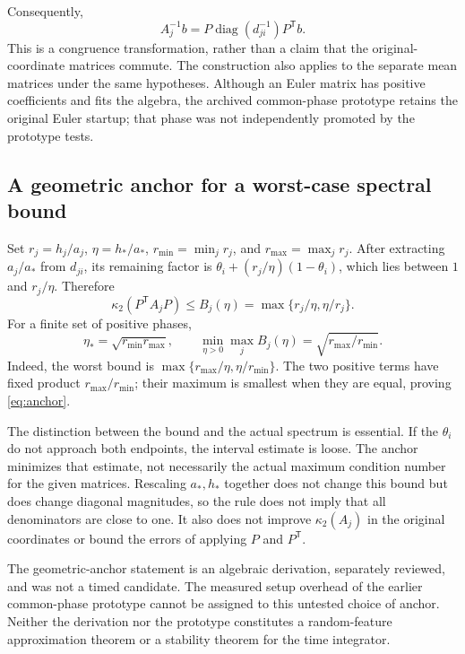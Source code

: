 Consequently,
\begin{equation}
 A_j^{-1}b=P\operatorname{diag}(d_{ji}^{-1})P^{\mathsf T}b.
 \label{eq:phase-inverse}
\end{equation}
This is a congruence transformation, rather than a claim that the
original-coordinate matrices commute. The construction also applies
to the separate mean matrices under the same hypotheses. Although
an Euler matrix has positive coefficients and fits the algebra, the
archived common-phase prototype retains the original Euler startup;
that phase was not independently promoted by the prototype tests.

\subsection{A geometric anchor for a worst-case spectral bound}

Set \(r_j=h_j/a_j\), \(\eta=h_*/a_*\),
\(r_{\min}=\min_jr_j\), and \(r_{\max}=\max_jr_j\).
After extracting \(a_j/a_*\) from \(d_{ji}\), its remaining
factor is \(\theta_i+(r_j/\eta)(1-\theta_i)\), which lies
between \(1\) and \(r_j/\eta\). Therefore
\begin{equation}
 \kappa_2(P^{\mathsf T}A_jP)
   \leq B_j(\eta)=\max\{r_j/\eta,\eta/r_j\}.
 \label{eq:bound}
\end{equation}
For a finite set of positive phases,
\begin{equation}
 \eta_* = \sqrt{r_{\min}r_{\max}},\qquad
 \min_{\eta>0}\max_j B_j(\eta)
       =\sqrt{r_{\max}/r_{\min}}.
 \label{eq:anchor}
\end{equation}
Indeed, the worst bound is
\(\max\{r_{\max}/\eta,\eta/r_{\min}\}\). The two positive
terms have fixed product \(r_{\max}/r_{\min}\); their maximum is
smallest when they are equal, proving \eqref{eq:anchor}.

The distinction between the bound and the actual spectrum is
essential. If the \(\theta_i\) do not approach both endpoints, the
interval estimate is loose. The anchor minimizes that estimate, not
necessarily the actual maximum condition number for the given
matrices. Rescaling \(a_*,h_*\) together does not change this bound
but does change diagonal magnitudes, so the rule does not imply
that all denominators are close to one. It also does not improve
\(\kappa_2(A_j)\) in the original coordinates or bound the errors
of applying \(P\) and \(P^{\mathsf T}\).

The geometric-anchor statement is an algebraic derivation, separately
reviewed, and was not a timed candidate. The measured setup overhead
of the earlier common-phase prototype cannot be assigned to this
untested choice of anchor. Neither the derivation nor the prototype
constitutes a random-feature approximation theorem or a stability
theorem for the time integrator.

